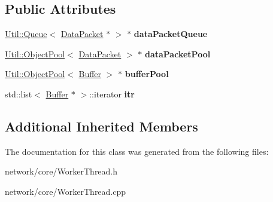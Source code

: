 \subsection*{Public Attributes}
\begin{DoxyCompactItemize}
\item 
\mbox{\label{class_c_g_1_1_worker_thread_a8e0c8febb197e68709d1c64e378159b1}} 
\mbox{\hyperlink{class_util_1_1_queue}{Util\+::\+Queue}}$<$ \mbox{\hyperlink{class_c_g_1_1_data_packet}{Data\+Packet}} $\ast$ $>$ $\ast$ {\bfseries data\+Packet\+Queue}
\item 
\mbox{\label{class_c_g_1_1_worker_thread_ae4b3ca99dc32ffe3670eace662ed8539}} 
\mbox{\hyperlink{class_util_1_1_object_pool}{Util\+::\+Object\+Pool}}$<$ \mbox{\hyperlink{class_c_g_1_1_data_packet}{Data\+Packet}} $>$ $\ast$ {\bfseries data\+Packet\+Pool}
\item 
\mbox{\label{class_c_g_1_1_worker_thread_a5634d8d0c007b15965b953034a9c015d}} 
\mbox{\hyperlink{class_util_1_1_object_pool}{Util\+::\+Object\+Pool}}$<$ \mbox{\hyperlink{class_c_g_1_1_buffer}{Buffer}} $>$ $\ast$ {\bfseries buffer\+Pool}
\item 
\mbox{\label{class_c_g_1_1_worker_thread_abb23e83f2bd73c067cd5e4c6b25a910c}} 
std\+::list$<$ \mbox{\hyperlink{class_c_g_1_1_buffer}{Buffer}} $\ast$ $>$\+::iterator {\bfseries itr}
\end{DoxyCompactItemize}
\subsection*{Additional Inherited Members}


The documentation for this class was generated from the following files\+:\begin{DoxyCompactItemize}
\item 
network/core/Worker\+Thread.\+h\item 
network/core/Worker\+Thread.\+cpp\end{DoxyCompactItemize}
